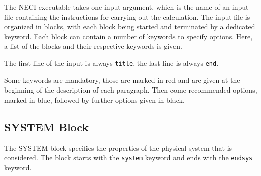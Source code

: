 \documentclass[a4paper,notitlepage,dvipsnames]{scrreprt}
\begin{document}
The NECI executable takes one input argument, which is the name of an input
file containing the instructions for carrying out the calculation. The input
file is organized in blocks, with each block being started and terminated by a
dedicated keyword. Each block can contain a number of keywords to specify
options. Here, a list of the blocks and their respective keywords is given.

The first line of the input is always \texttt{title}, the last line is always
\texttt{end}.

Some keywords are mandatory, those are marked in \textcolor{mred}{red} and are
given at the beginning of the description of each paragraph. Then come
recommended options, marked in \textcolor{oblue}{blue}, followed by further
options given in black.

\subsection{SYSTEM Block}
The SYSTEM block specifies the properties of the physical system that is
considered. The block starts with the \texttt{system} keyword and ends with
the \texttt{endsys} keyword.
\end{document}
